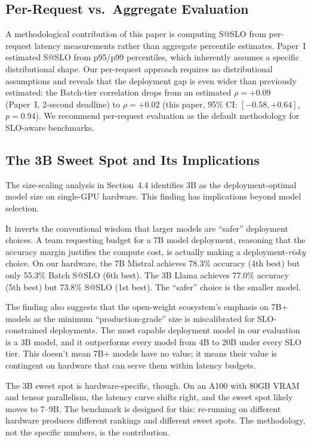 \documentclass[11pt]{article}
\begin{document}
\subsection{Per-Request vs.\ Aggregate Evaluation}

A methodological contribution of this paper is computing S@SLO from per-request latency measurements rather than aggregate percentile estimates.  Paper~I estimated S@SLO from p95/p99 percentiles, which inherently assumes a specific distributional shape.  Our per-request approach requires no distributional assumptions and reveals that the deployment gap is even wider than previously estimated: the Batch-tier correlation drops from an estimated $\rho = +0.09$ (Paper~I, 2-second deadline) to $\rho = +0.02$ (this paper, 95\% CI: $[-0.58, +0.64]$, $p = 0.94$).  We recommend per-request evaluation as the default methodology for SLO-aware benchmarks.

\subsection{The 3B Sweet Spot and Its Implications}

The size-scaling analysis in Section~4.4 identifies 3B as the deployment-optimal model size on single-GPU hardware.  This finding has implications beyond model selection.

It inverts the conventional wisdom that larger models are ``safer'' deployment choices.  A team requesting budget for a 7B model deployment, reasoning that the accuracy margin justifies the compute cost, is actually making a deployment-\emph{risky} choice.  On our hardware, the 7B Mistral achieves 78.3\% accuracy (4th best) but only 55.3\% Batch S@SLO (6th best).  The 3B Llama achieves 77.0\% accuracy (5th best) but 73.8\% S@SLO (1st best).  The ``safer'' choice is the smaller model.

The finding also suggests that the open-weight ecosystem's emphasis on 7B+ models as the minimum ``production-grade'' size is miscalibrated for SLO-constrained deployments.  The most capable deployment model in our evaluation is a 3B model, and it outperforms every model from 4B to 20B under every SLO tier.  This doesn't mean 7B+ models have no value; it means their value is contingent on hardware that can serve them within latency budgets.

The 3B sweet spot is hardware-specific, though.  On an A100 with 80GB VRAM and tensor parallelism, the latency curve shifts right, and the sweet spot likely moves to 7--9B.  The benchmark is designed for this: re-running on different hardware produces different rankings and different sweet spots.  The methodology, not the specific numbers, is the contribution.
\end{document}
